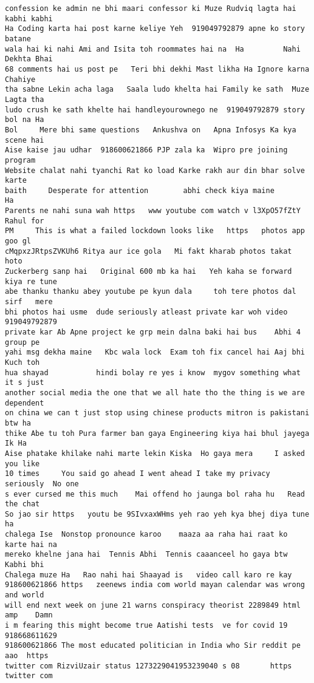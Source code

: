 \documentclass[11pt]{article}
\begin{document}
\begin{tcolorbox}[breakable, size=fbox, boxrule=.5pt, pad at break*=1mm, opacityfill=0]
\begin{Verbatim}[commandchars=\\\{\}]
confession ke admin ne bhi maari confessor ki Muze Rudviq lagta hai kabhi kabhi
Ha Coding karta hai post karne keliye Yeh  919049792879 apne ko story batane
wala hai ki nahi Ami and Isita toh roommates hai na  Ha         Nahi Dekhta Bhai
68 comments hai us post pe   Teri bhi dekhi Mast likha Ha Ignore karna Chahiye
tha sabne Lekin acha laga   Saala ludo khelta hai Family ke sath  Muze Lagta tha
ludo crush ke sath khelte hai handleyourownego ne  919049792879 story bol na Ha
Bol     Mere bhi same questions   Ankushva on   Apna Infosys Ka kya scene hai
Aise kaise jau udhar  918600621866 PJP zala ka  Wipro pre joining program
Website chalat nahi tyanchi Rat ko load Karke rakh aur din bhar solve karte
baith     Desperate for attention        abhi check kiya maine       Ha
Parents ne nahi suna wah https   www youtube com watch v l3XpO57fZtY Rahul for
PM     This is what a failed lockdown looks like   https   photos app goo gl
cMqpxzJRtpsZVKUh6 Ritya aur ice gola   Mi fakt kharab photos takat hoto
Zuckerberg sanp hai   Original 600 mb ka hai   Yeh kaha se forward kiya re tune
abe thanku thanku abey youtube pe kyun dala     toh tere photos dal sirf   mere
bhi photos hai usme  dude seriously atleast private kar woh video  919049792879
private kar Ab Apne project ke grp mein dalna baki hai bus    Abhi 4 group pe
yahi msg dekha maine   Kbc wala lock  Exam toh fix cancel hai Aaj bhi Kuch toh
hua shayad           hindi bolay re yes i know  mygov something what   it s just
another social media the one that we all hate tho the thing is we are dependent
on china we can t just stop using chinese products mitron is pakistani btw ha
thike Abe tu toh Pura farmer ban gaya Engineering kiya hai bhul jayega Ik Ha
Aise phatake khilake nahi marte lekin Kiska  Ho gaya mera     I asked you like
10 times     You said go ahead I went ahead I take my privacy seriously  No one
s ever cursed me this much    Mai offend ho jaunga bol raha hu   Read the chat
So jao sir https   youtu be 9SIvxaxWHms yeh rao yeh kya bhej diya tune       ha
chalega Ise  Nonstop pronounce karoo    maaza aa raha hai raat ko karte hai na
mereko khelne jana hai  Tennis Abhi  Tennis caaanceel ho gaya btw    Kabhi bhi
Chalega muze Ha   Rao nahi hai Shaayad is   video call karo re kay
918600621866 https   zeenews india com world mayan calendar was wrong and world
will end next week on june 21 warns conspiracy theorist 2289849 html amp    Damn
i m fearing this might become true Aatishi tests  ve for covid 19  918668611629
918600621866 The most educated politician in India who Sir reddit pe aao  https
twitter com RizviUzair status 1273229041953239040 s 08       https   twitter com

\end{Verbatim}
\end{tcolorbox}
\end{document}
